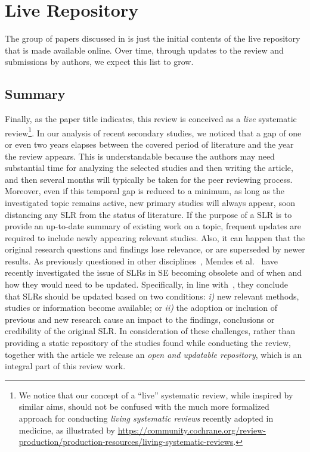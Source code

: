 \chapter{Live Repository}\label{chap:live}

The group of papers discussed in  is just the initial contents of the live repository that is made available online.
Over time, through updates to the review and submissions by authors, we expect this list to grow.


\section{Summary}
Finally, as the paper title indicates, this review is conceived
as a \textit{live} systematic review\footnote{We notice that our concept of a ``live'' systematic review, while inspired by similar aims, should not be confused with the much more formalized approach for conducting \textit{living systematic reviews} recently adopted in medicine, as illustrated by \url{https://community.cochrane.org/review-production/production-resources/living-systematic-reviews}.}. 
In our analysis of recent secondary studies, we noticed that a gap of one or even two years elapses between the covered period of literature and the year the review appears. 
This is understandable because the authors  may need substantial time for analyzing the selected studies and then writing the article, and then several months will typically be taken for the peer reviewing process. 
Moreover, even if this temporal gap is reduced to a minimum, as long as the investigated topic remains active, new primary studies will always appear, soon distancing any SLR from the status of literature.  
If the purpose of a SLR is to provide an up-to-date summary of existing work on a topic, frequent updates are required to include newly appearing relevant studies.
Also, it can happen that the original research questions and findings lose relevance, or are superseded by newer results.
As previously questioned in other disciplines~\cite{Garneri3507}, Mendes et al.~\cite{MENDES2020110607} have recently investigated the issue of SLRs in SE becoming obsolete and of when and how they would  need to be updated. 
Specifically, in line with~\cite{Garneri3507}, they conclude that SLRs should be updated based on two conditions: \textit{i)} new relevant methods, studies or information become available; or \textit{ii)} the adoption or inclusion of previous and new research cause an impact to the findings, conclusions or credibility of the original SLR.
In consideration of these challenges, rather than providing a static repository of the studies found while conducting the review, together with the article we release an \textit{open and updatable repository}, which is an integral part of this review work.
 
